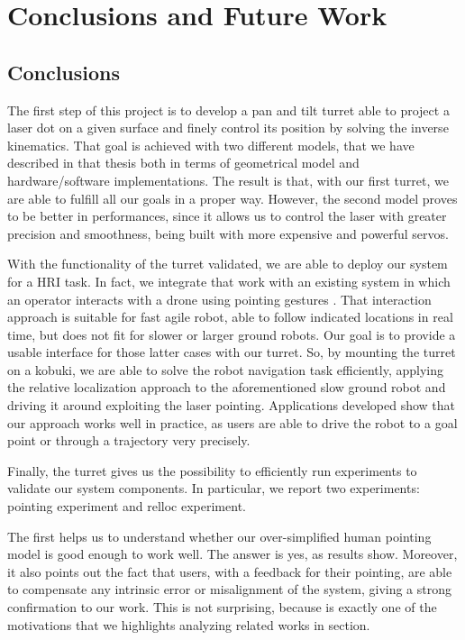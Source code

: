 \chapter{Conclusions and Future Work} 
\label{chap:5} 
\section{Conclusions}
The first step of this project is to develop a pan and tilt turret able to project a laser dot on a given surface and finely control its position by solving the inverse kinematics. That goal is achieved with two different models, that we have described in that thesis both in terms of geometrical model and hardware/software implementations. The result is that, with our first turret, we are able to fulfill all our goals in a proper way. However, the second model proves to be better in performances, since it allows us to control the laser with greater precision and smoothness, being built with more expensive and powerful servos.

With the functionality of the turret validated, we are able to deploy our system for a \ac{HRI} task. In fact, we integrate that work with an existing system in which an operator interacts with a drone using pointing gestures \cite{gromov2018robot}. That interaction approach is suitable for fast agile robot, able to follow indicated locations in real time, but does not fit for slower or larger ground robots. Our goal is to provide a usable interface for those latter cases with our turret. So, by mounting the turret on a kobuki, we are able to solve the robot navigation task efficiently, applying the relative localization approach to the aforementioned slow ground robot and driving it around exploiting the laser pointing. Applications developed show that our approach works well in practice, as users are able to drive the robot to a goal point or through a trajectory very precisely.

Finally, the turret gives us the possibility to efficiently run experiments to validate our system components. In particular, we report two experiments: pointing experiment and relloc experiment.

The first helps us to understand whether our over-simplified human pointing model is good enough to work well. The answer is yes, as results show. Moreover, it also points out the fact that users, with a feedback for their pointing, are able to compensate any intrinsic error or misalignment of the system, giving a strong confirmation to our work. This is not surprising, because is exactly one of the motivations that we highlights analyzing related works in \textit{} section.

